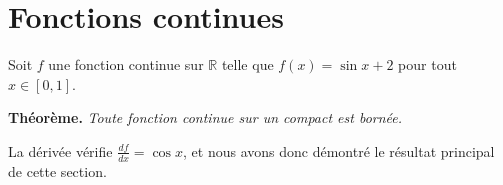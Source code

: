\documentclass{article}
\begin{document}
\section*{Fonctions continues}
Soit $f$ une fonction continue sur $\mathbb{R}$ telle que $f(x) = \sin x + 2$
pour tout $x \in [0,1]$.

\textbf{Théorème.} \emph{Toute fonction continue sur un compact est bornée.}

La dérivée vérifie $\frac{df}{dx} = \cos x$, et nous avons donc démontré
le résultat principal de cette section.
\end{document}
